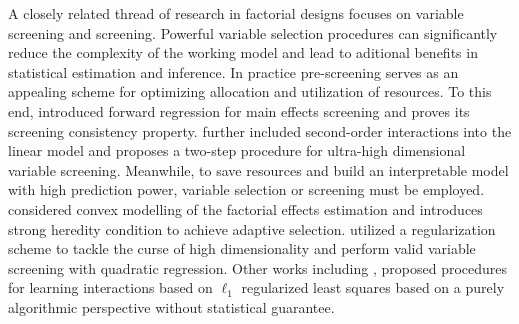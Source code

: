 \documentclass[12pt]{article}
\begin{document}
A closely related thread of research in factorial designs focuses on variable screening and  screening. Powerful variable selection procedures can significantly reduce the complexity of the working model and lead to aditional benefits in statistical estimation and inference. In practice pre-screening serves as an appealing scheme for optimizing allocation and utilization of resources. To this end, \cite{wang2009forward} introduced forward regression for main effects screening and proves its screening consistency property. \cite{hao2014interaction} further included second-order interactions into the linear model and proposes a two-step procedure for ultra-high dimensional variable screening. Meanwhile, to save resources and build an interpretable model with high prediction power, variable selection or screening must be employed. \cite{haris2016convex} considered convex modelling of the factorial effects estimation and introduces strong heredity condition to achieve adaptive selection.  \cite{hao2018model} utilized a regularization scheme to tackle the curse of high dimensionality and perform valid variable screening with quadratic regression. Other works including \cite{lim2015learning, bien2013lasso}, proposed procedures for learning interactions based on $\ell_1$ regularized least squares based on a purely algorithmic perspective without statistical guarantee.


\end{document}
